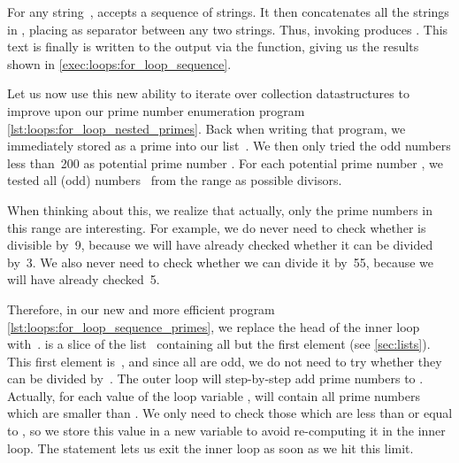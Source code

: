 For any string~,  accepts a sequence  of strings.
It then concatenates all the strings in , placing  as separator between any two strings.
Thus, invoking  produces .
This text is finally is written to the output via the  function, giving us the results shown in  \cref{exec:loops:for_loop_sequence}.

%

Let us now use this new ability to iterate over collection datastructures to improve upon our prime number enumeration program \cref{lst:loops:for_loop_nested_primes}.
Back when writing that program, we immediately stored  as a prime into our list~.
We then only tried the odd numbers less than~200 as potential prime number .
For each potential prime number , we tested all (odd) numbers~ from the range  as possible divisors.

When thinking about this, we realize that actually, only the prime numbers in this range are interesting.
For example, we do never need to check whether  is divisible by~9, because we will have already checked whether it can be divided by~3.
We also never need to check whether we can divide it by~55, because we will have already checked~5.

Therefore, in our new and more efficient program \cref{lst:loops:for_loop_sequence_primes}, we replace the head of the inner loop with~.
 is a slice of the list~ containing all but the first element (see \cref{sec:lists}).
This first element is~, and since all  are odd, we do not need to try whether they can be divided by~.
The outer loop will step-by-step add prime numbers to .
Actually, for each value of the loop variable ,  will contain all prime numbers which are smaller than .
We only need to check those which are less than or equal to , so we store this value in a new variable  to avoid re-computing it in the inner loop.
The  statement lets us exit the inner loop as soon as we hit this limit.

